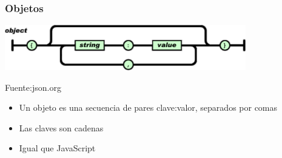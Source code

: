 \documentclass[ucs]{beamer}
\begin{document}
\begin{frame}[fragile]
\frametitle{Objetos}
\begin{center}
  \includegraphics[width=10.5cm]{figs/object}
\end{center}
\begin{flushright}
\begin{tiny}
Fuente:json.org
\end{tiny}
\end{flushright}
\begin{itemize}
\item 
Un objeto es una secuencia de pares clave:valor, separados por comas
\item
Las claves son cadenas
\item
Igual que JavaScript
 
\end{itemize}
\end{frame}
\end{document}
